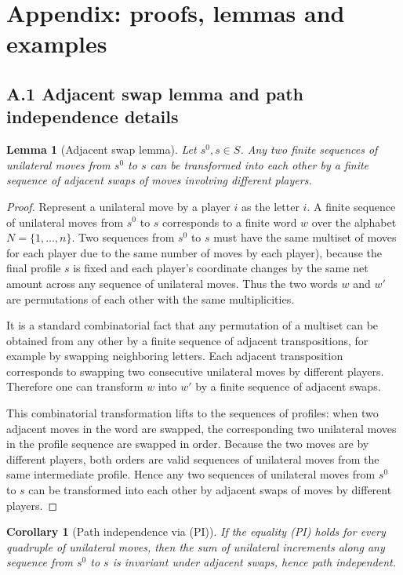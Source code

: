\documentclass[11pt]{article}
\newtheorem{lemma}[theorem]{Lemma}
\newtheorem{corollary}[theorem]{Corollary}
\begin{document}
\section{Appendix: proofs, lemmas and examples}


\subsection{A.1 Adjacent swap lemma and path independence details}

\begin{lemma}[Adjacent swap lemma]
Let \(s^0,s\in S\). Any two finite sequences of unilateral moves from \(s^0\)
to \(s\) can be transformed into each other by a finite sequence of adjacent
swaps of moves involving different players.
\end{lemma}

\begin{proof}
Represent a unilateral move by a player \(i\) as the letter \(i\). A finite
sequence of unilateral moves from \(s^0\) to \(s\) corresponds to a finite
word \(w\) over the alphabet \(N=\{1,\dots,n\}\). Two sequences from \(s^0\)
to \(s\) must have the same multiset of moves for each player due to the same
number of moves by each player), because the final profile \(s\) is fixed
and each player's coordinate changes by the same net amount across any
sequence of unilateral moves. Thus the two words \(w\) and \(w'\) are
permutations of each other with the same multiplicities.

It is a standard combinatorial fact that any permutation of a multiset can
be obtained from any other by a finite sequence of adjacent transpositions, for example by swapping neighboring letters. Each adjacent transposition corresponds to
swapping two consecutive unilateral moves by different players. Therefore
one can transform \(w\) into \(w'\) by a finite sequence of adjacent swaps.

This combinatorial transformation lifts to the sequences of profiles: when
two adjacent moves in the word are swapped, the corresponding two unilateral
moves in the profile sequence are swapped in order. Because the two moves are
by different players, both orders are valid sequences of unilateral moves from the same intermediate profile. Hence any two sequences of unilateral
moves from \(s^0\) to \(s\) can be transformed into each other by adjacent
swaps of moves by different players.
\end{proof}

\begin{corollary}[Path independence via (PI)]
If the equality (PI) holds for every quadruple of unilateral moves, then the
sum of unilateral increments along any sequence from \(s^0\) to \(s\) is
invariant under adjacent swaps, hence path independent.
\end{corollary}
\end{document}
